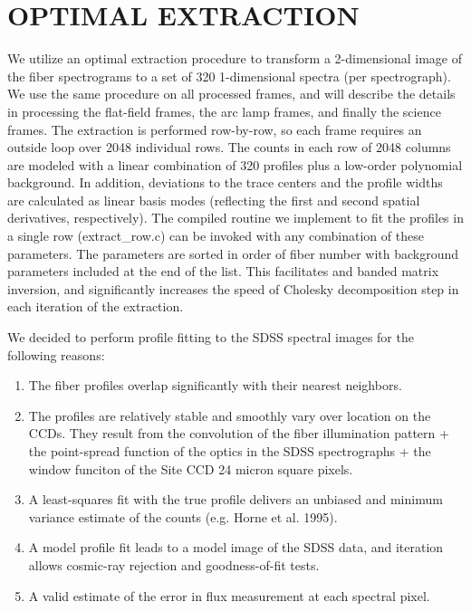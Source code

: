 \documentclass[12pt,preprint]{aastex}
\begin{document}
\section{OPTIMAL EXTRACTION}
\label{sec_extract}

We utilize an optimal extraction procedure to transform a 2-dimensional image of
the fiber spectrograms to a set of 320 1-dimensional spectra (per spectrograph).
We use the same procedure on all processed frames, 
and will describe the details in processing the flat-field frames, the
arc lamp frames, and finally the science frames.  
The extraction is performed row-by-row, so each frame requires an 
outside loop over 2048 individual rows.
The counts in each row of 2048 columns are modeled with a linear 
combination of 320 profiles plus a low-order
polynomial background.  In addition, deviations to the trace centers and
the profile widths are calculated as linear basis modes (reflecting the first
and second spatial derivatives, respectively).  The compiled routine
we implement to fit the profiles in a single row (extract\_row.c) can
be invoked with any combination of these parameters.  The parameters are
sorted in order of fiber number with background parameters included at the
end of the list.  This facilitates and banded matrix inversion, and 
significantly increases the speed of Cholesky decomposition step in each
iteration of the extraction.

We decided to perform profile fitting to the 
SDSS spectral images for the following reasons:  

\begin{enumerate}

\item{The fiber profiles overlap significantly with their nearest neighbors.}

\item{The profiles are relatively stable and smoothly vary over 
location on the CCDs.  They result from the convolution of the fiber 
illumination pattern + the point-spread function
of the optics in the SDSS spectrographs + the window funciton of the 
Site CCD 24 micron square pixels. }

\item{A least-squares fit with the true profile delivers an 
unbiased and minimum variance estimate of the counts (e.g. Horne et al. 1995).}

\item{A model profile fit leads to a model image of the SDSS data,
and iteration allows cosmic-ray rejection and goodness-of-fit tests.}

\item{A valid estimate of the error in flux measurement at each spectral pixel.}

\end{enumerate}
\end{document}
